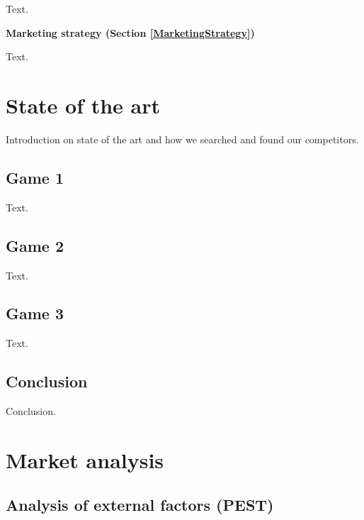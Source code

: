 \documentclass[12p]{article}
\begin{document}
Text.  \medskip

\textbf{Marketing strategy (Section \ref{MarketingStrategy})}

Text.


\newpage
\section{State of the art}

Introduction on state of the art and how we searched and found our competitors.

\subsection{Game 1}

Text.

\subsection{Game 2}

Text.

\subsection{Game 3}

Text.


\subsection{Conclusion}
Conclusion.


\newpage
\section{Market analysis} \label{MarketAnalysis}


\subsection{Analysis of external factors (PEST)} \label{PEST}
\end{document}
